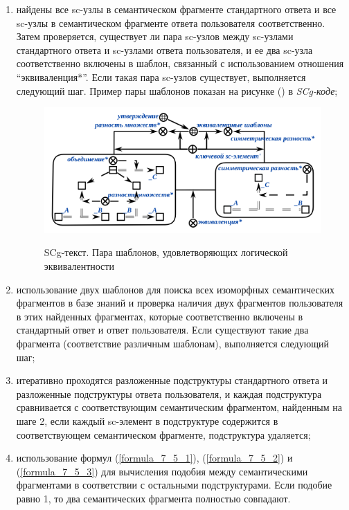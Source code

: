 \begin{enumerate}
	\item найдены все sc-узлы в семантическом фрагменте стандартного ответа и все sc-узлы в семантическом фрагменте ответа пользователя соответственно. Затем проверяется, существует ли пара sc-узлов между sc-узлами стандартного ответа и sc-узлами ответа пользователя, и ее два sc-узла соответственно включены в шаблон, связанный с использованием отношения ``эквиваленция*''. Если такая пара sc-узлов существует, выполняется следующий шаг. Пример пары шаблонов показан на рисунке (\textit{}) в \textit{SCg-коде};
	\begin{figure}[H]
		\caption{SCg-текст. Пара шаблонов, удовлетворяющих логической эквивалентности}
		\includegraphics[scale=1]{author/part7/figures/equivalent_template_example.png}
		\label{fig:ET_example}
	\end{figure}
	
	\item использование двух шаблонов для поиска всех изоморфных семантических фрагментов в базе знаний и проверка наличия двух фрагментов пользователя в этих найденных фрагментах, которые соответственно включены в стандартный ответ и ответ пользователя. Если существуют такие два фрагмента (соответствие различным шаблонам), выполняется следующий шаг;
	
	\item итеративно проходятся разложенные подструктуры стандартного ответа и разложенные подструктуры ответа пользователя, и каждая подструктура сравнивается с соответствующим семантическим фрагментом, найденным на шаге 2, если каждый sc-элемент в подструктуре содержится в соответствующем семантическом фрагменте, подструктура удаляется;
	
	\item использование формул (\ref{formula_7_5_1}), (\ref{formula_7_5_2}) и (\ref{formula_7_5_3}) для вычисления подобия между семантическими фрагментами в соответствии с остальными подструктурами. Если подобие равно 1, то два семантических фрагмента полностью совпадают.
	
\end{enumerate}

